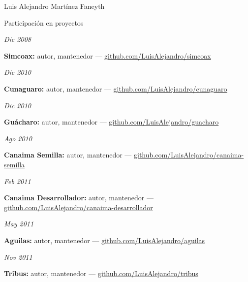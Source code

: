 \documentclass[11pt,letterpaper]{article}
\begin{document}
\begin{cv}{Luis Alejandro Mart\'inez Faneyth}
\begin{cvlist}{Participaci\'on en proyectos}
\item[{\parbox[t]{6em}{\textit{\large{Dic 2008}}}}]{
	\parbox[t]{\linewidth}{
		\textbf{Simcoax:} autor, mantenedor --- \href{http://github.com/LuisAlejandro/simcoax}{github.com/LuisAlejandro/simcoax}
	}
}
\item[{\parbox[t]{6em}{\textit{\large{Dic 2010}}}}]{
	\parbox[t]{\linewidth}{
		\textbf{Cunaguaro:} autor, mantenedor --- \href{http://github.com/LuisAlejandro/cunaguaro}{github.com/LuisAlejandro/cunaguaro}
	}
}
\item[{\parbox[t]{6em}{\textit{\large{Dic 2010}}}}]{
	\parbox[t]{\linewidth}{
		\textbf{Gu\'acharo:} autor, mantenedor --- \href{http://github.com/LuisAlejandro/guacharo}{github.com/LuisAlejandro/guacharo}
	}
}
\item[{\parbox[t]{6em}{\textit{\large{Ago 2010}}}}]{
	\parbox[t]{\linewidth}{
		\textbf{Canaima Semilla:} autor, mantenedor --- \href{http://github.com/LuisAlejandro/canaima-semilla}{github.com/LuisAlejandro/canaima-semilla}
	}
}
\item[{\parbox[t]{6em}{\textit{\large{Feb 2011}}}}]{
	\parbox[t]{\linewidth}{
		\textbf{Canaima Desarrollador:} autor, mantenedor --- \href{http://github.com/LuisAlejandro/canaima-desarrollador}{github.com/LuisAlejandro/canaima-desarrollador}
	}
}
\item[{\parbox[t]{6em}{\textit{\large{May 2011}}}}]{
	\parbox[t]{\linewidth}{
		\textbf{Aguilas:} autor, mantenedor --- \href{http://github.com/LuisAlejandro/aguilas}{github.com/LuisAlejandro/aguilas}
	}
}
\item[{\parbox[t]{6em}{\textit{\large{Nov 2011}}}}]{
	\parbox[t]{\linewidth}{
		\textbf{Tribus:} autor, mantenedor --- \href{http://github.com/LuisAlejandro/tribus}{github.com/LuisAlejandro/tribus}
	}
}
\end{cvlist}


\end{cv}
\end{document}
